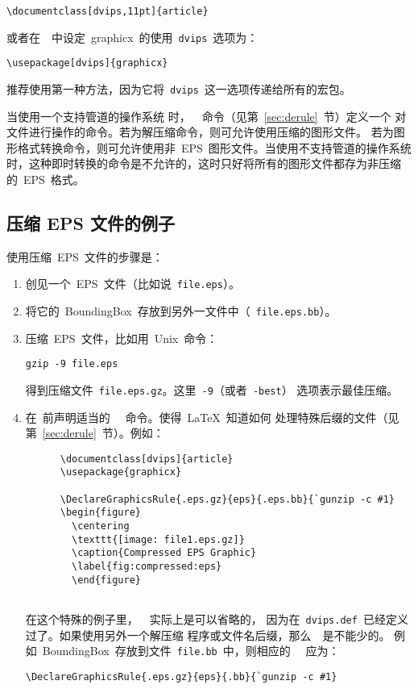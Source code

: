 \begin{Verbatim}[xleftmargin=1cm]
\documentclass[dvips,11pt]{article}
\end{Verbatim}
或者在~~中设定~\textsf{graphicx}~的使用~\texttt{dvips}~选项为：

\begin{Verbatim}[xleftmargin=1cm]
\usepackage[dvips]{graphicx}
\end{Verbatim}
推荐使用第一种方法，因为它将~\texttt{dvips}~这一选项传递给所有的宏包。

当使用一个支持管道的操作系统
时，~~命令（见第~\ref{sec:derule}~节）定义一个
对文件进行操作的命令。若为解压缩命令，则可允许使用压缩的图形文件。
若为图形格式转换命令，则可允许使用非~EPS~图形文件。当使用不支持管道的操作系统
时，这种即时转换的命令是不允许的，这时只好将所有的图形文件都存为非压缩
的~EPS~格式。

\clearpage

\subsection{压缩 EPS 文件的例子}\label{ssec:compresseps}

使用压缩~EPS~文件的步骤是：
\begin{enumerate}
\item 创见一个~EPS~文件（比如说~\texttt{file.eps}）。
\item 将它的~BoundingBox~存放到另外一文件中（~\texttt{file.eps.bb}）。
\item 压缩~EPS~文件，比如用~Unix~命令：
      \begin{Verbatim}[xleftmargin=1cm]
      gzip -9 file.eps
      \end{Verbatim}
      得到压缩文件~\texttt{file.eps.gz}。这里~\texttt{-9}（或者~\texttt{-best}）
      选项表示最佳压缩。
\item 在~前声明适当的
      ~~命令。使得~\LaTeX{}~知道如何
      处理特殊后缀的文件（见第~\ref{sec:derule}~节）。例如：
      \begin{Verbatim}
      \documentclass[dvips]{article}
      \usepackage{graphicx}
      
      \DeclareGraphicsRule{.eps.gz}{eps}{.eps.bb}{`gunzip -c #1}
      \begin{figure}
        \centering
        \texttt{[image: file1.eps.gz]}
        \caption{Compressed EPS Graphic}
        \label{fig:compressed:eps}
        \end{figure}
      
      \end{Verbatim}
在这个特殊的例子里，~~实际上是可以省略的，
因为在~\texttt{dvips.def}~已经定义过了。如果使用另外一个解压缩
程序或文件名后缀，那么~~是不能少的。
例如~BoundingBox~存放到文件~\texttt{file.bb}~中，则相应的
~~应为：
\begin{Verbatim}
\DeclareGraphicsRule{.eps.gz}{eps}{.bb}{`gunzip -c #1}
\end{Verbatim}
\end{enumerate}

